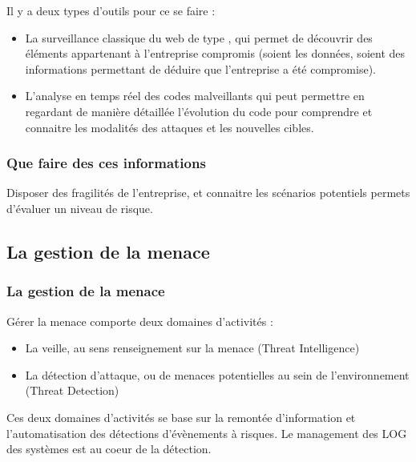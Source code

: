 Il y a deux types d'outils pour ce se faire : 

\begin{itemize}
	\item La surveillance classique du web de type , qui permet de découvrir des éléments appartenant à l'entreprise compromis (soient les données, soient des informations permettant de déduire que l'entreprise a été compromise).
	\item L'analyse en temps réel des codes malveillants qui peut permettre en regardant de manière détaillée l'évolution du code pour comprendre et connaitre les modalités des attaques et les nouvelles cibles.
\end{itemize}


\subsubsection{Que faire des ces informations}

Disposer des fragilités de l'entreprise, et connaitre les scénarios potentiels permets d'évaluer un niveau de risque. 


\subsection{La gestion de la menace}


\begin{frame}
\frametitle<presentation>{La gestion de la menace}

\end{frame}

Gérer la menace comporte deux domaines d'activités :

\begin{itemize}
  \item La veille, au sens renseignement sur la menace (Threat Intelligence)
  \item La détection d'attaque, ou de menaces potentielles au sein de l'environnement (Threat Detection)
\end{itemize}

Ces deux domaines d'activités se base sur la remontée d'information et l'automatisation des détections d'évènements à risques. Le management des LOG des systèmes est au coeur de la détection.


